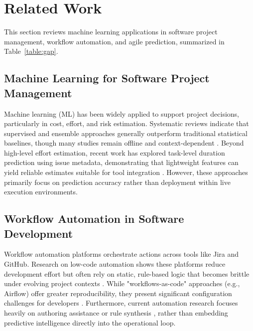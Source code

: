 \documentclass[conference]{IEEEtran}
\begin{document}
\section{Related Work}

This section reviews machine learning applications in software project management, workflow automation, and agile prediction, summarized in Table~\ref{table:gap}.

\subsection{Machine Learning for Software Project Management}
Machine learning (ML) has been widely applied to support project decisions, particularly in cost, effort, and risk estimation. Systematic reviews indicate that supervised and ensemble approaches generally outperform traditional statistical baselines, though many studies remain offline and context-dependent \cite{shamim2025_costreview, mahdi2021_spm_slr}. Beyond high-level effort estimation, recent work has explored task-level duration prediction using issue metadata, demonstrating that lightweight features can yield reliable estimates suitable for tool integration \cite{sousa2023_task_effort}. However, these approaches primarily focus on prediction accuracy rather than deployment within live execution environments.

\subsection{Workflow Automation in Software Development}
Workflow automation platforms orchestrate actions across tools like Jira and GitHub. Research on low-code automation shows these platforms reduce development effort but often rely on static, rule-based logic that becomes brittle under evolving project contexts \cite{prinz2021_lowcode_slr}. While "workflows-as-code" approaches (e.g., Airflow) offer greater reproducibility, they present significant configuration challenges for developers \cite{yasmin2024_airflow_wac}. Furthermore, current automation research focuses heavily on authoring assistance or rule synthesis \cite{gupta2023_action_suggestions, zhao2021_trigger_action}, rather than embedding predictive intelligence directly into the operational loop.
\end{document}
